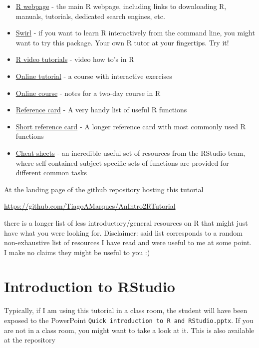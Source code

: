 \documentclass[
]{article}
\begin{document}
\begin{itemize}
\item
  \href{http://r-project.org}{R webpage} - the main R webpage, including
  links to downloading R, manuals, tutorials, dedicated search engines,
  etc.
\item
  \href{https://swirlstats.com/}{Swirl} - if you want to learn R
  interactively from the command line, you might want to try this
  package. Your own R tutor at your fingertips. Try it!
\item
  \href{http://blog.revolutionanalytics.com/2013/08/google-video-r-tutorials.html}{R
  video tutorials} - video how to's in R
\item
  \href{http://www.datamind.org/}{Online tutorial} - a course with
  interactive exercises
\item
  \href{http://faculty.washington.edu/tlumley/Rcourse/}{Online course} -
  notes for a two-day course in R
\item
  \href{http://cran.r-project.org/doc/contrib/refcard.pdf}{Reference
  card} - A very handy list of useful R functions
\item
  \href{http://cran.r-project.org/doc/contrib/Short-refcard.pdf}{Short
  reference card} - A longer reference card with most commonly used R
  functions
\item
  \href{https://www.rstudio.com/resources/cheatsheets/}{Cheat sheets} -
  an incredible useful set of resources from the RStudio team, where
  self contained subject specific sets of functions are provided for
  different common tasks
\end{itemize}

At the landing page of the github repository hosting this tutorial

\url{https://github.com/TiagoAMarques/AnIntro2RTutorial}

there is a longer list of less introductory/general resources on R that
might just have what you were looking for. Disclaimer: said list
corresponds to a random non-exhaustive list of resources I have read and
were useful to me at some point. I make no claims they might be useful
to you :)

\section{Introduction to RStudio}\label{introduction-to-rstudio}

Typically, if I am using this tutorial in a class room, the student will
have been exposed to the PowerPoint
\texttt{Quick\ introduction\ to\ R\ and\ RStudio.pptx}. If you are not
in a class room, you might want to take a look at it. This is also
available at the repository
\end{document}
